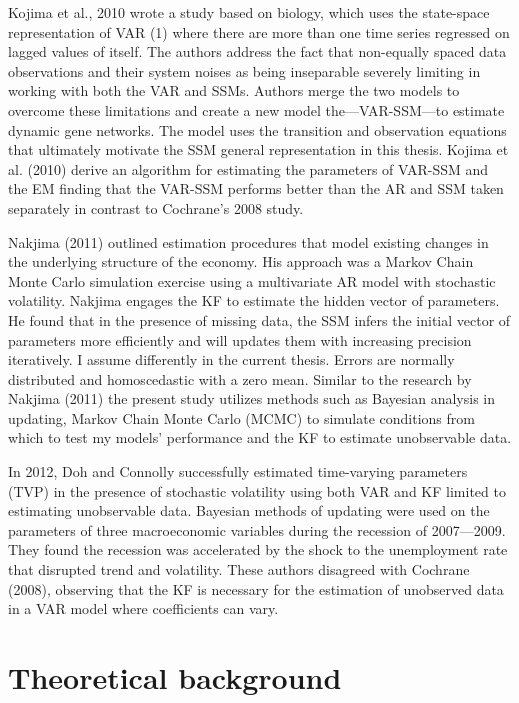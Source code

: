 \documentclass[12pt, letterpaper, twoside]{article}
\begin{document}
Kojima et al., 2010 wrote a study based on biology, which uses the state-space representation of VAR (1) where there are more than one time series regressed on lagged values of itself. The authors address the fact that non-equally spaced data observations and their system noises as being inseparable severely limiting in working with both the VAR and SSMs. Authors merge the two models to overcome these limitations and create a new model the—VAR-SSM—to estimate dynamic gene networks. The model uses the transition and observation equations that ultimately motivate the SSM general representation in this thesis. Kojima et al. (2010) derive an algorithm for estimating the parameters of VAR-SSM and the EM finding that the VAR-SSM performs better than the AR and SSM taken separately in contrast to Cochrane’s 2008 study.

Nakjima (2011) outlined estimation procedures that model existing changes in the underlying structure of the economy. His approach was a Markov Chain Monte Carlo simulation exercise using a multivariate AR model with stochastic volatility. Nakjima engages the KF to estimate the hidden vector of parameters. He found that in the presence of missing data, the SSM infers the initial vector of parameters more efficiently and will updates them with increasing precision iteratively. I assume differently in the current thesis. Errors are normally distributed and homoscedastic with a zero mean. Similar to the research by Nakjima (2011) the present study utilizes methods such as Bayesian analysis in updating, Markov Chain Monte Carlo (MCMC) to simulate conditions from which to test my models’ performance and the KF to estimate unobservable data. 

In 2012, Doh and Connolly successfully estimated time-varying parameters (TVP) in the presence of stochastic volatility using both VAR and KF limited to estimating unobservable data. Bayesian methods of updating were used on the parameters of three macroeconomic variables during the recession of 2007—2009. They found the recession was accelerated by the shock to the unemployment rate that disrupted trend and volatility. These authors disagreed with Cochrane (2008), observing that the KF is necessary for the estimation of unobserved data in a VAR model where coefficients can vary.

\section{Theoretical background}





\begin{comment}
This text won't show up in the compiled pdf
this is just a multi-line comment. Useful
to, for instance, comment out slow-rendering
while working on the draft.
\end{comment}
\end{document}
